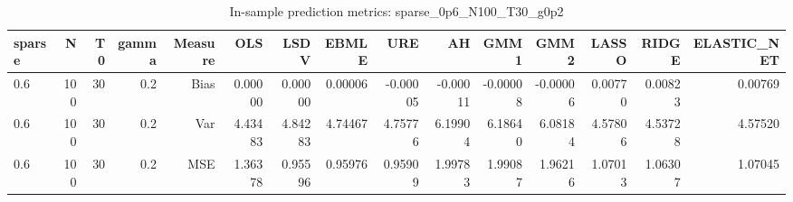 \begin{table}[!htbp]\centering
\caption{In-sample prediction metrics: sparse_0p6_N100_T30_g0p2}
\label{tab:table2_sparse_0p6_N100_T30_g0p2}
\begin{tabular}{lrrrrrrrrrrrrrr}
\hline
sparse & N & T0 & gamma & Measure & OLS & LSDV & EBMLE & URE & AH & GMM1 & GMM2 & LASSO & RIDGE & ELASTIC_NET \\
\hline
0.6 & 100 & 30 & 0.2 & Bias & 0.00000 & 0.00000 & 0.00006 & -0.00005 & -0.00011 & -0.00008 & -0.00006 & 0.00770 & 0.00823 & 0.00769 \\
0.6 & 100 & 30 & 0.2 & Var & 4.43483 & 4.84283 & 4.74467 & 4.75776 & 6.19904 & 6.18640 & 6.08184 & 4.57806 & 4.53728 & 4.57520 \\
0.6 & 100 & 30 & 0.2 & MSE & 1.36378 & 0.95596 & 0.95976 & 0.95909 & 1.99783 & 1.99087 & 1.96216 & 1.07013 & 1.06307 & 1.07045 \\
\hline
\end{tabular}
\end{table}

